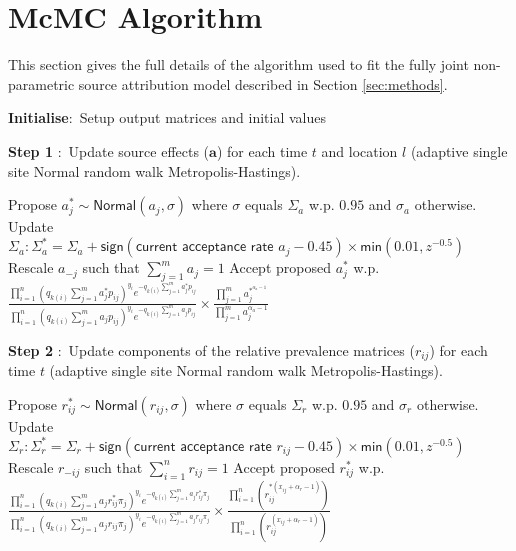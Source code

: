 \section{McMC Algorithm}

This section gives the full details of the algorithm used to fit the fully joint non-parametric source attribution model described in Section \ref{sec:methods}.
\begin{algorithm}%
\begin{algorithmic} 
\bigskip{}
\State \textbf{Initialise}$\colon$ Setup output matrices and initial values
\bigskip{}

\bigskip{}
\State \parbox[t]{\dimexpr\linewidth-\algorithmicindent\relax}{%
    \setlength{\hangindent}{\algorithmicindent}%
      \textbf{Step 1} $\colon$ Update source effects ($\mathbf{a}$) for each time $t$ and location $l$ (adaptive single site Normal random walk Metropolis-Hastings). }\strut 
\medskip     
\State Propose $a_{j}^*\sim\textsf{Normal}\left(a_{j},\sigma\right)$ where $\sigma$ equals $\Sigma_a$ w.p. $0.95$ and $\sigma_a$ otherwise.
\State Update $\Sigma_a \colon \Sigma_a^*=\Sigma_a+\textsf{sign}\left(\textsf{current acceptance rate }a_j-0.45\right)\times\textsf{min}\left(0.01,z^{-0.5}\right)$
\EndIf
\State Rescale $a_{-j}$ such that $\sum_{j=1}^m a_{j}=1$
\State Accept proposed $a_{j}^*$ w.p. $\frac{\prod_{i=1}^{n}\left(q_{k\left(i\right)}\sum_{j=1}^{m}a_{j}^{*}p_{ij}\right)^{y_{i}}e^{-q_{k\left(i\right)}\sum_{j=1}^{m}a_{j}^{*}p_{ij}}}{\prod_{i=1}^{n}\left(q_{k\left(i\right)}\sum_{j=1}^{m}a_{j}p_{ij}\right)^{y_{i}}e^{-q_{k\left(i\right)}\sum_{j=1}^{m}a_{j}p_{ij}}}\times\frac{\prod_{j=1}^{m}a_{j}^{*^{\alpha_{a}-1}}}{\prod_{j=1}^{m}a_{j}^{\alpha_{a}-1}}$

\bigskip{}
\State \parbox[t]{\dimexpr\linewidth-\algorithmicindent\relax}{%
    \setlength{\hangindent}{\algorithmicindent}%
      \textbf{Step 2} $\colon$ Update components of the relative prevalence matrices ($r_{ij}$) for each time $t$ (adaptive single site Normal random walk Metropolis-Hastings).}\strut
\medskip 
\State Propose $r_{ij}^*\sim\textsf{Normal}\left(r_{ij},\sigma\right)$ where $\sigma$ equals $\Sigma_r$ w.p. $0.95$ and $\sigma_r$ otherwise.
\State Update $\Sigma_r \colon \Sigma_r^*=\Sigma_r+\textsf{sign}\left(\textsf{current acceptance rate }r_{ij}-0.45\right)\times\textsf{min}\left(0.01,z^{-0.5}\right)$
\EndIf
\State Rescale $r_{-ij}$ such that $\sum_{i=1}^n r_{ij}=1$
\State Accept proposed $r_{ij}^*$ w.p. $\frac{\prod_{i=1}^{n}\left(q_{k\left(i\right)}\sum_{j=1}^{m}a_{j}r_{ij}^{*}\pi_j\right)^{y_{i}}e^{-q_{k\left(i\right)}\sum_{j=1}^{m}a_{j}r_{ij}^{*}\pi_j}}{\prod_{i=1}^{n}\left(q_{k\left(i\right)}\sum_{j=1}^{m}a_{j}r_{ij}\pi_j\right)^{y_{i}}e^{-q_{k\left(i\right)}\sum_{j=1}^{m}a_{j}r_{ij}\pi_j}}\times\frac{\prod_{i=1}^{n}\left(r_{ij}^{*\left(x_{ij}+\alpha_{r}-1\right)}\right)}{\prod_{i=1}^{n}\left(r_{ij}^{\left(x_{ij}+\alpha_{r}-1\right)}\right)}$


\end{algorithmic}
\end{algorithm}
